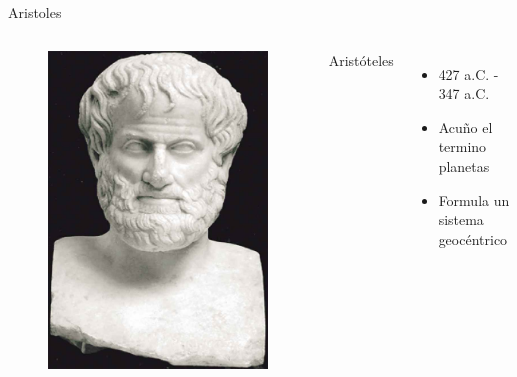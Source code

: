 \documentclass{beamer}
\begin{document}

\begin{frame}{Aristoles} 
\begin{columns}
\begin{figure}
 \centering
 \includegraphics[scale=0.2]{Imagenes/Aristoteles}
 \end{figure}
 \begin{center}
 \small
 Aristóteles 
 \end{center}
\begin{itemize}
\item 427 a.C. - 347 a.C.
\item Acuño el termino planetas
\item Formula un sistema geocéntrico
\end{itemize}
\end{columns}
\end{frame}
\end{document}
